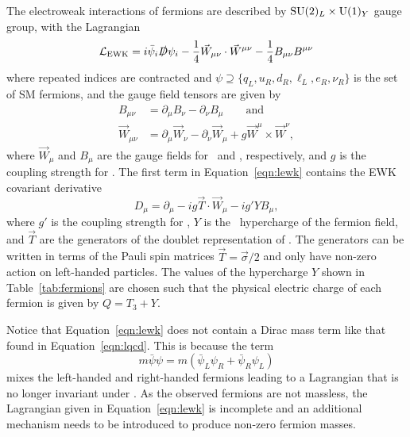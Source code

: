 The electroweak interactions of fermions are described by $\text{SU}(2)_L \times \text{U}(1)_Y$ gauge group, with the Lagrangian
\begin{equation}
  \label{eqn:lewk}
  \mathcal{L}_{\text{EWK}} = i \bar \psi_i \slashed D \psi_i - \frac{1}{4} \vec W_{\mu\nu} \cdot \vec W^{\mu\nu} - \frac{1}{4} B_{\mu\nu} B^{\mu\nu}
\end{equation}
where repeated indices are contracted and $\psi \supseteq \{q_L, u_R, d_R, \ell_L, e_R, \nu_R\}$ is the set of SM fermions, and the gauge field tensors are given by
\begin{align}
  B_{\mu\nu} & = \partial_\mu B_\nu - \partial_\nu B_\mu \qquad \text{and} \nonumber \\
  \vec W_{\mu\nu} & = \partial_\mu \vec W_\nu - \partial_\nu \vec W_\mu + g \vec W^\mu \times \vec W^\nu ,
\end{align}
where $\vec W_\mu$ and $B_\mu$ are the gauge fields for \sutwo\ and \uone, respectively, and $g$ is the coupling strength for \sutwo.
The first term in Equation~\ref{eqn:lewk} contains the EWK covariant derivative
\begin{equation}
  D_{\mu} = \partial_\mu - i g \vec T \cdot \vec W_\mu - i g' Y B_\mu,
\end{equation}
where $g'$ is the coupling strength for \uone,
$Y$ is the \uone\ hypercharge of the fermion field,
and $\vec T$ are the generators of the doublet representation of \sutwo.
The generators can be written in terms of the Pauli spin matrices $\vec T = \vec \sigma / 2$ and only have non-zero action on left-handed particles. %
The values of the hypercharge $Y$ shown in Table~\ref{tab:fermions} are chosen such that the physical electric charge of each fermion is given by $Q =  T_3 + Y$.

Notice that Equation~\ref{eqn:lewk} does not contain a Dirac mass term like that found in Equation~\ref{eqn:lqcd}.
This is because the term
\begin{equation}
  m \bar \psi \psi = m \left( \bar \psi_L \psi_R + \bar \psi_R \psi_L \right)
\end{equation}
mixes the left-handed and right-handed fermions leading to a Lagrangian that is no longer invariant under \sutwo.
As the observed fermions are not massless, the Lagrangian given in Equation~\ref{eqn:lewk} is incomplete and an additional mechanism needs to be introduced to produce non-zero fermion masses.

